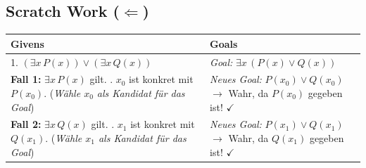 \documentclass{article}
\begin{document}
\subsection*{Scratch Work ($\Leftarrow$)}
\begin{center}
\small
\begin{tabular}{ L{0.45\textwidth} | L{0.45\textwidth} }
\toprule
\textbf{Givens} & \textbf{Goals} \\
. $(\exists x \, P(x)) \lor (\exists x \, Q(x))$ & \emph{Goal:} $\exists x \, (P(x) \lor Q(x))$ \\[1ex]
\hline
\textbf{Fall 1:} $\exists x \, P(x)$ gilt. . $x_0$ ist konkret mit $P(x_0)$. \newline
(\emph{Wähle $x_0$ als Kandidat für das Goal}) & \emph{Neues Goal:} $P(x_0) \lor Q(x_0)$ \newline
$\rightarrow$ Wahr, da $P(x_0)$ gegeben ist! $\checkmark$ \\[1ex]
\hline
\textbf{Fall 2:} $\exists x \, Q(x)$ gilt. . $x_1$ ist konkret mit $Q(x_1)$. \newline
(\emph{Wähle $x_1$ als Kandidat für das Goal}) & \emph{Neues Goal:} $P(x_1) \lor Q(x_1)$ \newline
$\rightarrow$ Wahr, da $Q(x_1)$ gegeben ist! $\checkmark$ \\
\bottomrule
\end{tabular}
\end{center}
\end{document}
